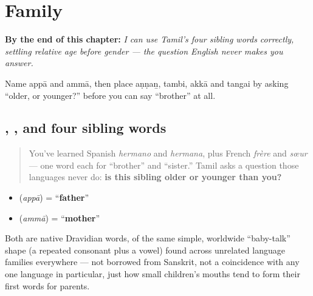 
\chapter{Family}
\label{ch:ta-family}

\begin{chapteropening}
\textbf{By the end of this chapter:} \emph{I can use Tamil's four sibling words correctly, settling relative age before gender — the question English never makes you answer.}

Name appā and ammā, then place aṇṇaṉ, tambi, akkā and tangai by asking \textquotedblleft{}older, or younger?\textquotedblright{} before you can say \textquotedblleft{}brother\textquotedblright{} at all.
\end{chapteropening}

\section[\texorpdfstring{\ta{அப்பா} \ta{அம்மா} \ta{அண்ணன்} … (appā ammā aṇṇaṉ …)}{அப்பா அம்மா அண்ணன் … (appā ammā aṇṇaṉ …)}]{, , and four sibling words}

\label{lesson:TA-C12-kudumbam}



\begin{quote}
You've learned Spanish \emph{hermano} and \emph{hermana}, plus French \emph{frère} and \emph{sœur} — one word each for \textquotedblleft{}brother\textquotedblright{} and \textquotedblleft{}sister.\textquotedblright{} Tamil asks a question those languages never do: \textbf{is this sibling older or younger than you?}
\end{quote}

\begin{cousinweb}
\begin{itemize}
\raggedright
  \item \textbf{} (\emph{appā}) = \textquotedblleft{}\textbf{father}\textquotedblright{}
  \item \textbf{} (\emph{ammā}) = \textquotedblleft{}\textbf{mother}\textquotedblright{}
\end{itemize}

Both are native Dravidian words, of the same simple, worldwide \textquotedblleft{}baby-talk\textquotedblright{} shape (a repeated consonant plus a vowel) found across unrelated language families everywhere — not borrowed from Sanskrit, not a coincidence with any one language in particular, just how small children's mouths tend to form their first words for parents.
\end{cousinweb}

